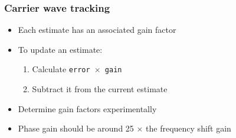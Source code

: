 \documentclass[aspectratio=169]{beamer}
\begin{document}
\begin{frame}
    \frametitle{Carrier wave tracking}

    \begin{itemize}
        \item<2-> Each estimate has an associated gain factor
        
        \item<3-> To update an estimate:

        \begin{enumerate}
            \item<4-> Calculate \texttt{error $\times$ gain}

            \item<5-> Subtract it from the current estimate
        \end{enumerate}

        \item<6-> Determine gain factors experimentally
        
        \item<7-> Phase gain should be around 25 $\times$ the frequency shift gain
    \end{itemize}
\end{frame}
\end{document}

